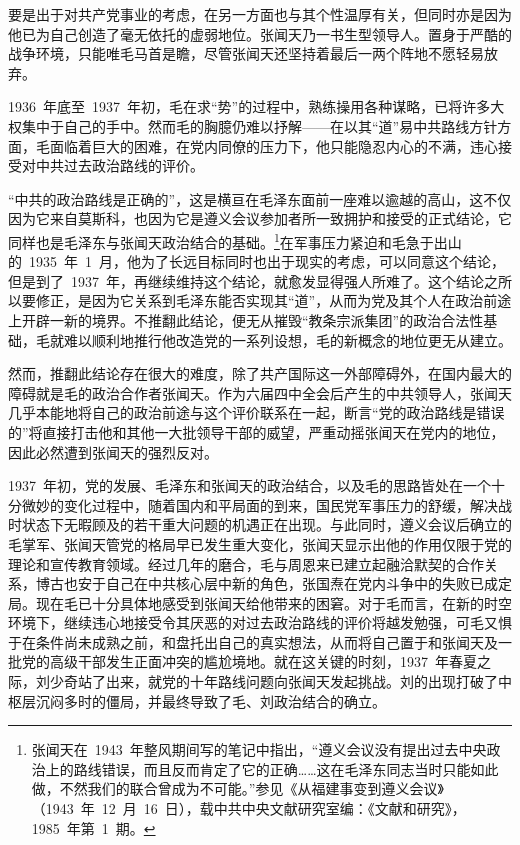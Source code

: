 要是出于对共产党事业的考虑，在另一方面也与其个性温厚有关，但同时亦是因为他已为自己创造了毫无依托的虚弱地位。张闻天乃一书生型领导人。置身于严酷的战争环境，只能唯毛马首是瞻，尽管张闻天还坚持着最后一两个阵地不愿轻易放弃。

1936~年底至~1937~年初，毛在求“势”的过程中，熟练操用各种谋略，已将许多大权集中于自己的手中。然而毛的胸臆仍难以抒解——在以其“道”易中共路线方针方面，毛面临着巨大的困难，在党内同僚的压力下，他只能隐忍内心的不满，违心接受对中共过去政治路线的评价。

“中共的政治路线是正确的”，这是横亘在毛泽东面前一座难以逾越的高山，这不仅因为它来自莫斯科，也因为它是遵义会议参加者所一致拥护和接受的正式结论，它同样也是毛泽东与张闻天政治结合的基础。\footnote{张闻天在~1943~年整风期间写的笔记中指出，“遵义会议没有提出过去中央政治上的路线错误，而且反而肯定了它的正确……这在毛泽东同志当时只能如此做，不然我们的联合曾成为不可能。”参见《从福建事变到遵义会议》（1943~年~12~月~16~日），载中共中央文献研究室编：《文献和研究》，1985~年第~1~期。}在军事压力紧迫和毛急于出山的~1935~年~1~月，他为了长远目标同时也出于现实的考虑，可以同意这个结论，但是到了~1937~年，再继续维持这个结论，就愈发显得强人所难了。这个结论之所以要修正，是因为它关系到毛泽东能否实现其“道”，从而为党及其个人在政治前途上开辟一新的境界。不推翻此结论，便无从摧毁“教条宗派集团”的政治合法性基础，毛就难以顺利地推行他改造党的一系列设想，毛的新概念的地位更无从建立。

然而，推翻此结论存在很大的难度，除了共产国际这一外部障碍外，在国内最大的障碍就是毛的政治合作者张闻天。作为六届四中全会后产生的中共领导人，张闻天几乎本能地将自己的政治前途与这个评价联系在一起，断言“党的政治路线是错误的”将直接打击他和其他一大批领导干部的威望，严重动摇张闻天在党内的地位，因此必然遭到张闻天的强烈反对。

1937~年初，党的发展、毛泽东和张闻天的政治结合，以及毛的思路皆处在一个十分微妙的变化过程中，随着国内和平局面的到来，国民党军事压力的舒缓，解决战时状态下无暇顾及的若干重大问题的机遇正在出现。与此同时，遵义会议后确立的毛掌军、张闻天管党的格局早已发生重大变化，张闻天显示出他的作用仅限于党的理论和宣传教育领域。经过几年的磨合，毛与周恩来已建立起融洽默契的合作关系，博古也安于自己在中共核心层中新的角色，张国焘在党内斗争中的失败已成定局。现在毛已十分具体地感受到张闻天给他带来的困窘。对于毛而言，在新的时空环境下，继续违心地接受令其厌恶的对过去政治路线的评价将越发勉强，可毛又惧于在条件尚未成熟之前，和盘托出自己的真实想法，从而将自己置于和张闻天及一批党的高级干部发生正面冲突的尴尬境地。就在这关键的时刻，1937~年春夏之际，刘少奇站了出来，就党的十年路线问题向张闻天发起挑战。刘的出现打破了中枢层沉闷多时的僵局，并最终导致了毛、刘政治结合的确立。

